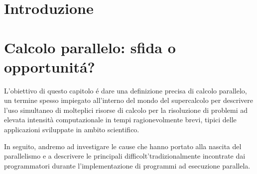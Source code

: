 \documentclass[
	a4paper,
	twoside,
	12pt
]{book}
\begin{document}
\frontmatter


\tableofcontents

\mainmatter

\chapter*{Introduzione}


\chapter{Calcolo parallelo: sfida o opportunit\'a?}
\label{cap1}
L'obiettivo di questo capitolo \'e dare una definizione precisa di calcolo parallelo, un termine spesso impiegato all'interno del mondo
del supercalcolo per descrivere l’uso simultaneo di molteplici risorse di calcolo per la risoluzione di problemi ad elevata intensità computazionale
in tempi ragionevolmente brevi, tipici delle applicazioni sviluppate in ambito scientifico.

In seguito, andremo ad investigare le cause che hanno portato alla nascita del parallelismo e a descrivere le principali difficolt'\a tradizionalmente incontrate dai programmatori durante l'implementazione di programmi ad esecuzione parallela.

\backmatter



\end{document}
